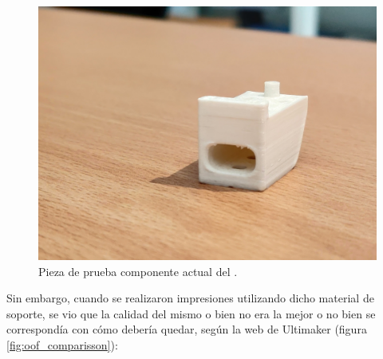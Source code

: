 \begin{figure}[H]
    \centering
    \includegraphics[width=.7\linewidth]{pictures/test_piece.jpg}
    \caption*{Pieza de prueba componente actual del \pArm{}.}
\end{figure}

Sin embargo, cuando se realizaron impresiones utilizando dicho material de soporte,
se vio que la calidad del mismo o bien no era la mejor o no bien se correspondía con
cómo debería quedar, según la web de Ultimaker (figura \ref{fig:oof_comparisson}):

